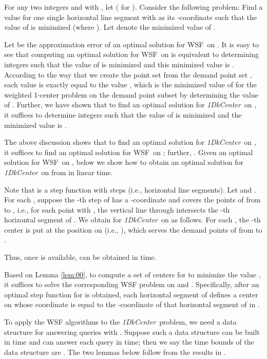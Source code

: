 \documentclass{llncs}
\newenvironment{myproof}{\noindent {\textbf{Proof:}}\rm}{\hfill \rm}
\def\wsf{WSF}
\def\problem{{\it 1DkCenter}}
\begin{document}
\begin{myproof}
For any two integers  and  with , let
 ( for
). Consider the following problem: Find a value  for one
single horizontal line segment with  as its -coordinate such
that the value of  is minimized (where ).
Let  denote the minimized value of .

Let  be the approximation error of an optimal solution
for \wsf\ on . It is easy to see that computing an optimal
solution for \wsf\ on  is equivalent to determining 
integers  such that
the value of  is minimized and this minimized value is
.
According to the way that we create the point set  from the
demand point set , each value  is exactly equal to
the value , which is the minimized value of
 for the weighted 1-center problem on the demand
point subset  by determining the value of .
Further, we have shown that to find an optimal solution for
\problem\ on , it suffices to determine  integers  such that the value of
 is minimized and the minimized value is
.

The above discussion shows that to find an optimal solution for
\problem\ on , it suffices to find an optimal solution for \wsf\
on ; further, . Given an optimal solution
 for \wsf\ on , below we show how to obtain an
optimal solution  for \problem\ on  from  in linear time.

Note that  is a step function with  steps (i.e.,
horizontal line segments).  Let  and . For each , suppose the -th step of  has a
-coordinate  and covers the points of  from
 to , i.e., for each point 
with , the vertical line through 
intersects the -th horizontal segment of .
We obtain  for \problem\ on  as follows. For each , the -th center  is put at the position  on
 (i.e., ), which serves the demand points of  from
 to .

Thus, once  is available,  can be obtained in
 time.
\end{myproof}

Based on Lemma \ref{lem:00}, to compute a set  of  centers for
 to minimize the value , it suffices to solve the
corresponding WSF problem on  and . Specifically, after an
optimal step function  for  is obtained, each horizontal
segment of  defines a center on  whose coordinate is equal to
the -coordinate of that horizontal segment of  in .

To apply the WSF algorithms to the \problem\ problem, we need a data
structure for answering queries  with . Suppose such a data structure can be built in 
time and can answer each query  in  time; then we
say the time bounds of the data structure are . The two
lemmas below follow from the results in \cite{ref:ChenAp091}.
\end{document}
